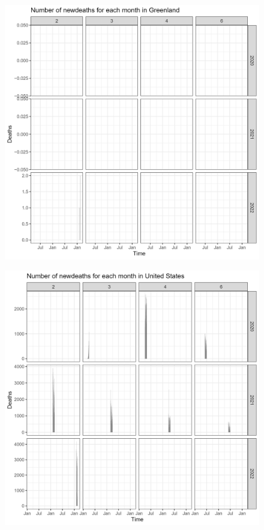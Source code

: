 \documentclass[a4paper]{article}
\theoremstyle{definition}
\begin{document}
\begin{enumerate}[i)]
\begin{enumerate}[1)]
\begin{figure}[H]
			\end{figure}
			\begin{figure}[H]
				\centering
				\includegraphics[scale=0.25]{images/6.2.2.png}
			\end{figure}
			\begin{figure}[H]
				\centering
				\includegraphics[scale=0.25]{images/6.2.3.png}

\end{figure}
\end{enumerate}
\end{enumerate}
\end{document}
